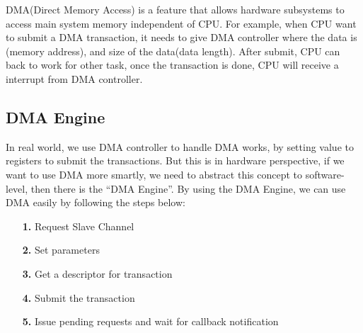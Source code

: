 DMA(Direct Memory Access) is a feature that allows hardware subsystems to access main system memory independent of CPU. For example, when CPU want to submit a DMA transaction, it needs to give DMA controller where the data is (memory address), and size of the data(data length). After submit, CPU can back to work for other task, once the transaction is done, CPU will receive a interrupt from DMA controller.
 

\subsection{DMA Engine }
\label{subsec:DMA Engine}
In real world, we use DMA controller to handle DMA works, by setting value to registers to submit the transactions. But this is in hardware perspective, if we want to use DMA more smartly, we need to abstract this concept to software-level, then there is the ``DMA Engine''. By using the DMA Engine, we can use DMA easily by following the steps below:
\begin{itemize}
\setlength{\itemsep}{0pt}
\item[\textbf{1.}] Request Slave Channel
\item[\textbf{2.}] Set parameters 
\item[\textbf{3.}] Get a descriptor for transaction
\item[\textbf{4.}] Submit the transaction
\item[\textbf{5.}] Issue pending requests and wait for callback notification
\end{itemize}

